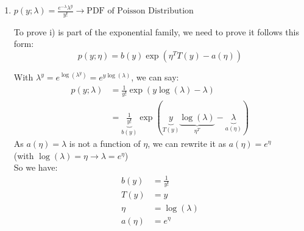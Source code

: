 \begin{answer}
    \begin{enumerate}
\item $p(y; \lambda) = \frac{e^{-\lambda} \lambda^y}{y!} \rightarrow \text{PDF of Poisson Distribution}$


To prove i) is part of the exponential family, we need to prove it follows this form:
\[ p(y; \eta) = b(y) \exp(\eta^T T(y) - a(\eta)) \]

With $\lambda^y = e^{\log(\lambda^y)} = e^{y \log(\lambda)}$, we can say:
\begin{align*}
    p(y; \lambda) &= \frac{1}{y!} \exp(y \log(\lambda) - \lambda) \\
    &= \underbrace{\frac{1}{y!}}_{b(y)} \exp(\underbrace{y}_{T(y)} \underbrace{\log(\lambda)}_{\eta^T} - \underbrace{\lambda}_{a(\eta)})
\end{align*}
As $a(\eta) = \lambda$ is not a function of $\eta$, we can rewrite it as $a(\eta) = e^\eta$ \\ (with $\log(\lambda) = \eta \rightarrow \lambda=e^\eta$) \\


So we have:
\begin{align*}
    b(y) &= \frac{1}{y!} \\
    T(y) &= y \\
    \eta &= \log(\lambda) \\
    a(\eta) &= e^\eta
\end{align*}
\end{enumerate}
\end{answer}

